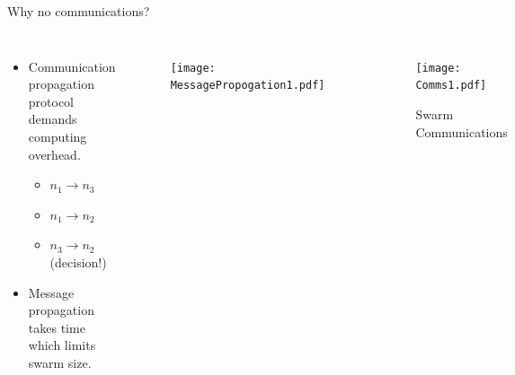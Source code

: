 \documentclass{beamer}
\begin{document}
\begin{frame}{Why no communications?}
  
  \begin{columns}
      \begin{itemize}
        \item {
          Communication propagation protocol demands computing overhead.
          \begin{itemize}
            \item $n_1 \rightarrow n_3$
            \item $n_1 \rightarrow n_2$
            \item $n_3 \rightarrow n_2$ (decision!) 
          \end{itemize}
        }
        \item {   
          Message propagation takes time which limits swarm size.
        }
      \end{itemize}
      \begin{figure}
        \begin{center}
          \texttt{[image: MessagePropogation1.pdf]}
        \end{center}
      \end{figure}
      \begin{figure}
        \begin{center}
          \texttt{[image: Comms1.pdf]}
        \end{center}
        \caption{Swarm Communications}
      \end{figure}
    \end{columns}
\end{frame}

\end{document}
